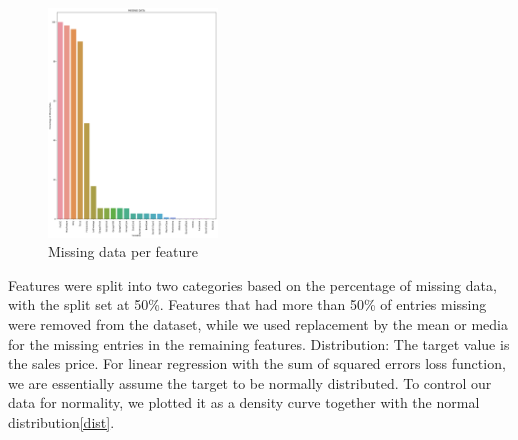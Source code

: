 \begin{figure}[h!]
  \centering
  \includegraphics[width=0.4\textwidth]{images/missing-data-count-chart.png}
  \caption{Missing data per feature}
  \label{fig:missing}
\end{figure}

Features were split into two categories based on the percentage of missing data, with the split set at 50\%. Features that had more than 50\% of entries missing were removed from the dataset, while we used replacement by the mean or media for the missing entries in the remaining features.\newline
Distribution:\newline
The target value is the sales price. For linear regression with the sum of squared errors loss function, we are essentially assume the target to be normally distributed. To control our data for normality, we plotted it as a density curve together with the normal distribution\ref{dist}.

